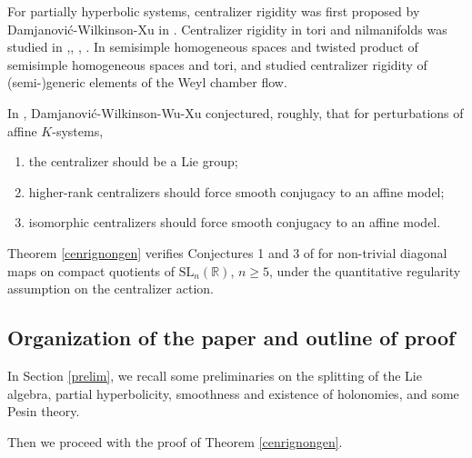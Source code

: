 \documentclass[11pt]{amsart}
\numberwithin{equation}{section}
\theoremstyle{plain}
\begin{document}
For partially hyperbolic systems, centralizer rigidity was first proposed by Damjanovi\'c-Wilkinson-Xu in \cite{DWX}. Centralizer rigidity in tori and nilmanifolds was studied in \cite{DWX23},\cite{DWWX}, \cite{GSXZ}, \cite{Sandfeldt}. In semisimple homogeneous spaces and twisted product of semisimple homogeneous spaces and tori, \cite{Wang} and \cite{Wang26} studied centralizer rigidity of (semi-)generic elements of the Weyl chamber flow.

In \cite{DWWX}, Damjanovi\'c-Wilkinson-Wu-Xu conjectured,
roughly, that for perturbations of affine \(K\)-systems, \begin{enumerate}
 
    \item the centralizer should
be a Lie group;

\item higher-rank centralizers should
force smooth conjugacy to an affine model;

\item isomorphic centralizers should
force smooth conjugacy to an affine model.
 
\end{enumerate}  Theorem \ref{cenrignongen} verifies Conjectures 1 and 3 of \cite{DWWX} for non-trivial diagonal maps on compact quotients of
\(\mathrm{SL}_n(\mathbb R)\), \(n\ge5\), under the quantitative regularity
assumption on the centralizer action.  

 \subsection{Organization of the paper and outline of proof}\label{outl}

In Section \ref{prelim}, we recall some preliminaries on the splitting of the Lie algebra, partial hyperbolicity, smoothness and existence of holonomies, and some Pesin theory. 

Then we proceed with the proof of Theorem \ref{cenrignongen}.
\end{document}
